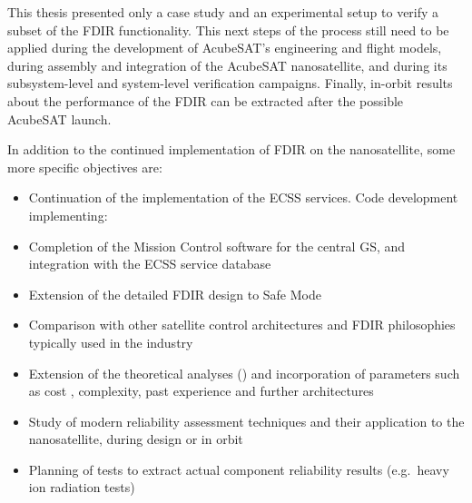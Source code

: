 \documentclass[a4paper,nobib]{tufte-book}
\begin{document}
\begin{fullwidth}
This thesis presented only a case study and an experimental setup to verify a subset of the \acs{FDIR} functionality. This next steps of the process still need to be applied during the development of AcubeSAT's engineering and flight models, during assembly and integration of the AcubeSAT nanosatellite, and during its subsystem-level and system-level verification campaigns. Finally, in-orbit results about the performance of the \acs{FDIR} can be extracted after the possible AcubeSAT launch.

In addition to the continued implementation of \acs{FDIR} on the nanosatellite, some more specific objectives are:
\begin{itemize}
	\item Continuation of the implementation of the \acs{ECSS} services. Code development implementing:
	\item Completion of the Mission Control software for the central \acl{GS}, and integration with the \acs{ECSS} service database 
	\item Extension of the detailed \acs{FDIR} design to Safe Mode
	\item Comparison with other satellite control architectures and \acs{FDIR} philosophies typically used in the industry \parencite{NASA-HDBK-1002,zolghadri_advanced_modelbased_2012}
	\item Extension of the theoretical analyses () and incorporation of parameters such as cost \parencite{chang_development_reliabilitycorrected_2013}, complexity, past experience and further architectures
	\item Study of modern reliability assessment techniques and their application to the nanosatellite, during design or in orbit
	\item Planning of tests to extract actual component reliability results (e.g.\ heavy ion radiation tests)
\end{itemize}




\end{fullwidth}

\appendix

\begin{fullwidth}
\printbibliography[heading=bibnumbered]
\end{fullwidth}


\printindex
\end{document}
